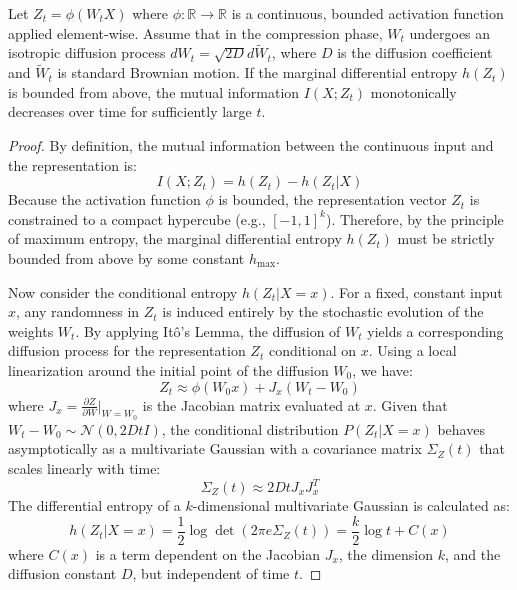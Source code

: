 \begin{theorem}
    Let $Z_t = \phi(W_t X)$ where $\phi : \mathbb{R} \to \mathbb{R}$ is a continuous, bounded activation function applied element-wise. Assume that in the compression phase, $W_t$ undergoes an isotropic diffusion process $dW_t = \sqrt{2D} d\tilde{W}_t$, where $D$ is the diffusion coefficient and $\tilde{W}_t$ is standard Brownian motion. If the marginal differential entropy $h(Z_t)$ is bounded from above, the mutual information $I(X; Z_t)$ monotonically decreases over time for sufficiently large $t$.
\end{theorem}

\begin{proof}
    By definition, the mutual information between the continuous input and the representation is:
    \begin{equation}
        I(X; Z_t) = h(Z_t) - h(Z_t | X)
    \end{equation}
    Because the activation function $\phi$ is bounded, the representation vector $Z_t$ is constrained to a compact hypercube (e.g., $[-1, 1]^k$). Therefore, by the principle of maximum entropy, the marginal differential entropy $h(Z_t)$ must be strictly bounded from above by some constant $h_{\text{max}}$.
    
    Now consider the conditional entropy $h(Z_t | X = x)$. For a fixed, constant input $x$, any randomness in $Z_t$ is induced entirely by the stochastic evolution of the weights $W_t$. 
    By applying Itô's Lemma, the diffusion of $W_t$ yields a corresponding diffusion process for the representation $Z_t$ conditional on $x$. Using a local linearization around the initial point of the diffusion $W_0$, we have:
    \begin{equation}
        Z_t \approx \phi(W_0 x) + J_x (W_t - W_0)
    \end{equation}
    where $J_x = \frac{\partial Z}{\partial W}\big|_{W=W_0}$ is the Jacobian matrix evaluated at $x$. Given that $W_t - W_0 \sim \mathcal{N}(0, 2DtI)$, the conditional distribution $P(Z_t | X=x)$ behaves asymptotically as a multivariate Gaussian with a covariance matrix $\Sigma_Z(t)$ that scales linearly with time:
    \begin{equation}
        \Sigma_Z(t) \approx 2 D t J_x J_x^T
    \end{equation}
    The differential entropy of a $k$-dimensional multivariate Gaussian is calculated as:
    \begin{equation}
        h(Z_t | X = x) = \frac{1}{2} \log \det (2 \pi e \Sigma_Z(t)) = \frac{k}{2} \log t + C(x)
    \end{equation}
    where $C(x)$ is a term dependent on the Jacobian $J_x$, the dimension $k$, and the diffusion constant $D$, but independent of time $t$.
    

\end{proof}
